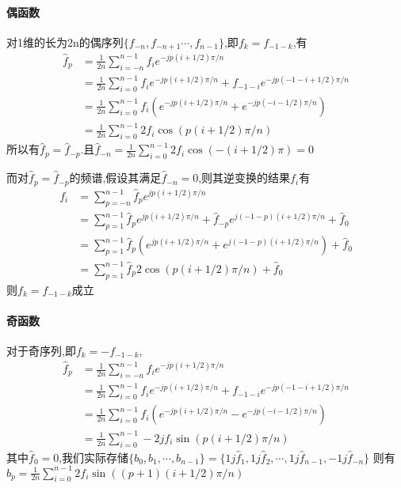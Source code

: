 \documentclass[UTF8]{ctexart}
\begin{document}
\paragraph{偶函数}
对1维的长为2n的偶序列$\{f_{-n},f_{-n+1}\cdots,f_{n-1}\}$,即$f_{k}=f_{-1-k}$,有
\begin{equation*}
  \begin{split}
     \hat{f}_{p}    &= \frac{1}{2n}\sum\limits_{i=-n}^{n-1} f_{i} e^{-jp(i+1/2)\pi/n} \\
                    &= \frac{1}{2n}\sum\limits_{i=0}^{n-1} f_{i} e^{-jp(i+1/2)\pi/n}+f_{-1-i}e^{-jp(-1-i+1/2)\pi/n} \\
                    &= \frac{1}{2n}\sum\limits_{i=0}^{n-1} f_{i} (e^{-jp(i+1/2)\pi/n}+e^{-jp(-i-1/2)\pi/n}) \\
                    &= \frac{1}{2n}\sum\limits_{i=0}^{n-1} 2f_{i} \cos(p(i+1/2)\pi/n)
  \end{split}
\end{equation*}
所以有$\hat{f}_p=\hat{f}_{-p}$.且$\hat{f}_{-n}=\frac{1}{2n}\sum\limits_{i=0}^{n-1} 2f_{i} \cos(-(i+1/2)\pi)=0 $

而对$\hat{f}_p=\hat{f}_{-p}$的频谱,假设其满足$\hat{f}_{-n}=0$,则其逆变换的结果$f_i$有
\begin{equation*}
  \begin{split}
     f_{i}          &= \sum\limits_{p=-n}^{n-1} \hat{f}_{p} e^{jp(i+1/2)\pi/n} \\
                    &= \sum\limits_{p=1}^{n-1} \hat{f}_{p} e^{jp(i+1/2)\pi/n}+\hat{f}_{-p}e^{j(-1-p)(i+1/2)\pi/n} + \hat{f}_{0}  \\
                    &= \sum\limits_{p=1}^{n-1} \hat{f}_{p} (e^{jp(i+1/2)\pi/n}+e^{j(-1-p)(i+1/2)\pi/n}) + \hat{f}_{0}\\
                    &= \sum\limits_{p=1}^{n-1} \hat{f}_{p} 2\cos(p(i+1/2)\pi/n)+ \hat{f}_{0}
  \end{split}
\end{equation*}
则$f_{k}=f_{-1-k}$成立
\paragraph{奇函数}
对于奇序列,即$f_{k}=-f_{-1-k}$,
\begin{equation*}
  \begin{split}
     \hat{f}_{p}    &= \frac{1}{2n}\sum\limits_{i=-n}^{n-1} f_{i} e^{-jp(i+1/2)\pi/n} \\
                    &= \frac{1}{2n}\sum\limits_{i=0}^{n-1} f_{i} e^{-jp(i+1/2)\pi/n}+f_{-1-i}e^{-jp(-1-i+1/2)\pi/n} \\
                    &= \frac{1}{2n}\sum\limits_{i=0}^{n-1} f_{i} (e^{-jp(i+1/2)\pi/n}-e^{-jp(-i-1/2)\pi/n}) \\
                    &= \frac{1}{2n}\sum\limits_{i=0}^{n-1} -2jf_{i} \sin(p(i+1/2)\pi/n)
  \end{split}
\end{equation*}
其中$\hat{f}_0=0$,我们实际存储$\{b_0,b_1,\cdots,b_{n-1}\} = \{1j\hat{f}_1,1j\hat{f}_2,\cdots,1j\hat{f}_{n-1},-1j\hat{f}_{-n}\}$
则有$b_p=\frac{1}{2n}\sum\limits_{i=0}^{n-1} 2f_{i} \sin((p+1)(i+1/2)\pi/n)$
\end{document}
